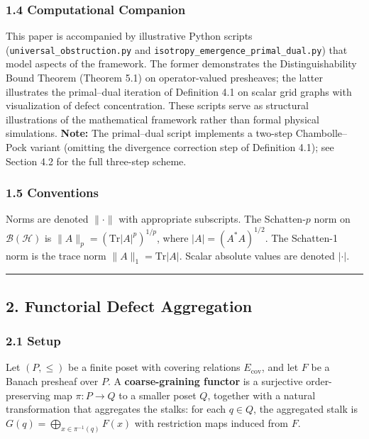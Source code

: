 \documentclass[
]{article}
\begin{document}
\subsubsection{1.4 Computational
Companion}\label{computational-companion}

This paper is accompanied by illustrative Python scripts
(\texttt{universal\_obstruction.py} and
\texttt{isotropy\_emergence\_primal\_dual.py}) that model aspects of the
framework. The former demonstrates the Distinguishability Bound Theorem
(Theorem 5.1) on operator-valued presheaves; the latter illustrates the
primal--dual iteration of Definition 4.1 on scalar grid graphs with
visualization of defect concentration. These scripts serve as structural
illustrations of the mathematical framework rather than formal physical
simulations. \textbf{Note:} The primal--dual script implements a
two-step Chambolle--Pock variant (omitting the divergence correction
step of Definition 4.1); see Section 4.2 for the full three-step scheme.

\subsubsection{1.5 Conventions}\label{conventions}

Norms are denoted \(\lVert \cdot \rVert\) with appropriate subscripts.
The Schatten-\(p\) norm on \(\mathcal{B}(\mathcal{H})\) is
\(\|A\|_p = (\mathrm{Tr}|A|^p)^{1/p}\), where \(|A| = (A^*A)^{1/2}\).
The Schatten-1 norm is the trace norm \(\|A\|_1 = \mathrm{Tr}|A|\).
Scalar absolute values are denoted \(|\cdot|\).

\begin{center}\rule{0.5\linewidth}{0.5pt}\end{center}

\subsection{2. Functorial Defect
Aggregation}\label{functorial-defect-aggregation}

\subsubsection{2.1 Setup}\label{setup}

Let \((P, \leq)\) be a finite poset with covering relations
\(E_{\mathrm{cov}}\), and let \(F\) be a Banach presheaf over \(P\). A
\textbf{coarse-graining functor} is a surjective order-preserving map
\(\pi: P \to Q\) to a smaller poset \(Q\), together with a natural
transformation that aggregates the stalks: for each \(q \in Q\), the
aggregated stalk is \(G(q) = \bigoplus_{x \in \pi^{-1}(q)} F(x)\) with
restriction maps induced from \(F\).
\end{document}
